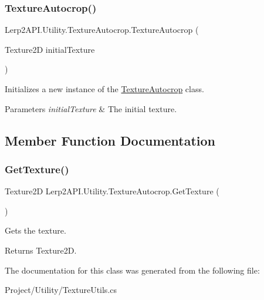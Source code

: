 \subsubsection{\texorpdfstring{Texture\+Autocrop()}{TextureAutocrop()}}
{\footnotesize\ttfamily Lerp2\+A\+P\+I.\+Utility.\+Texture\+Autocrop.\+Texture\+Autocrop (\begin{DoxyParamCaption}\item[{Texture2D}]{initial\+Texture }\end{DoxyParamCaption})\hspace{0.3cm}{\ttfamily [inline]}}



Initializes a new instance of the \hyperlink{class_lerp2_a_p_i_1_1_utility_1_1_texture_autocrop}{Texture\+Autocrop} class. 


\begin{DoxyParams}{Parameters}
{\em initial\+Texture} & The initial texture.\\
\hline
\end{DoxyParams}


\subsection{Member Function Documentation}
\mbox{\label{class_lerp2_a_p_i_1_1_utility_1_1_texture_autocrop_a0732af109b4214f9b7afb341d42c7735}} 
\subsubsection{\texorpdfstring{Get\+Texture()}{GetTexture()}}
{\footnotesize\ttfamily Texture2D Lerp2\+A\+P\+I.\+Utility.\+Texture\+Autocrop.\+Get\+Texture (\begin{DoxyParamCaption}{ }\end{DoxyParamCaption})\hspace{0.3cm}{\ttfamily [inline]}}



Gets the texture. 

\begin{DoxyReturn}{Returns}
Texture2D.
\end{DoxyReturn}


The documentation for this class was generated from the following file\+:\begin{DoxyCompactItemize}
\item 
Project/\+Utility/Texture\+Utils.\+cs\end{DoxyCompactItemize}
